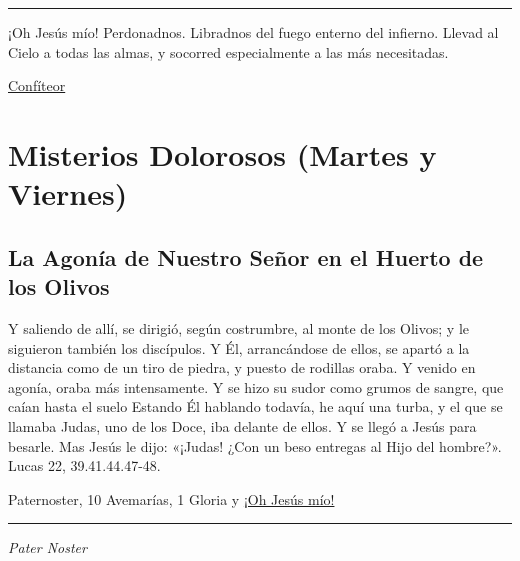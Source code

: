 \documentclass[a4paper,11pt, oneside]{report}
\begin{document}
\begin{center}\rule{1\linewidth}{\linethickness}\end{center}

\medskip
\hypertarget{finalPerdida}{¡Oh Jesús mío! Perdonadnos. Libradnos del fuego enterno del infierno. Llevad al Cielo a todas las almas, y socorred especialmente a las más 
necesitadas.}

\par\bigskip
\hyperlink{sec:confiteor}{Confíteor}


\section*{Misterios Dolorosos (Martes y Viernes)}\label{sec:dolorosos}

\subsection*{La Agonía de Nuestro Señor en el Huerto de los Olivos}

Y saliendo de allí, se dirigió, según costrumbre, al monte de los Olivos; y le siguieron también los discípulos.
Y Él, arrancándose de ellos, se apartó a la distancia como de un tiro de piedra, y puesto de rodillas oraba. 
Y venido en agonía, oraba más intensamente. Y se hizo su sudor como grumos de sangre, que caían hasta el suelo
Estando Él hablando todavía, he aquí una turba, y el que se llamaba Judas, uno de los Doce, iba delante de ellos. 
Y se llegó a Jesús para besarle.       Mas Jesús le dijo: «¡Judas! ¿Con un beso entregas al Hijo del hombre?». 
Lucas 22, 39.41.44.47-48.
  
 Paternoster, 10 Avemarías, 1 Gloria y \hyperlink{finalHuerto}{¡Oh Jesús mío!}

\medskip

\begin{center}\rule{1\linewidth}{\linethickness}\end{center}

\medskip
\textit{Pater Noster}
\end{document}

